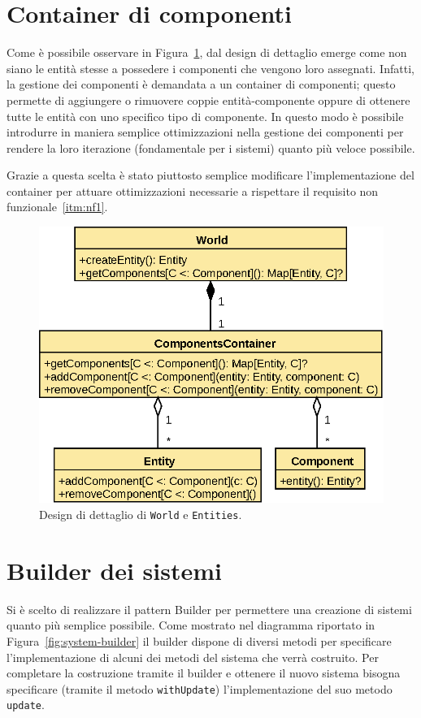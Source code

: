 

\section{Container di componenti}\label{sec:container-di-componenti}
Come è possibile osservare in Figura~\ref{fig:world-detail}, dal design di dettaglio emerge come
non siano le entità stesse a possedere i componenti che vengono loro assegnati.
Infatti, la gestione dei componenti è demandata a un container di componenti;
questo permette di aggiungere o rimuovere coppie entità-componente oppure di ottenere tutte le entità con uno specifico
tipo di componente.
In questo modo è possibile introdurre in maniera semplice ottimizzazioni nella gestione dei
componenti per rendere la loro iterazione (fondamentale per i sistemi) quanto più veloce possibile.

Grazie a questa scelta è stato piuttosto semplice modificare l'implementazione del container per attuare ottimizzazioni
necessarie a rispettare il requisito non funzionale~\ref{itm:nf1}.
\begin{figure}[H]
    \centering
    \includegraphics[width=\textwidth]{./img/WorldDetail}
    \caption{Design di dettaglio di \texttt{World} e \texttt{Entities}.}
    \label{fig:world-detail}
\end{figure}

\section{Builder dei sistemi}\label{sec:builder-dei-sistemi}
Si è scelto di realizzare il pattern Builder per permettere una creazione di sistemi quanto più semplice possibile.
Come mostrato nel diagramma riportato in Figura~\ref{fig:system-builder} il builder dispone di diversi
metodi per specificare l'implementazione di alcuni dei metodi del sistema che verrà costruito.
Per completare la costruzione tramite il builder e ottenere il nuovo sistema bisogna specificare
(tramite il metodo \texttt{withUpdate}) l'implementazione del suo metodo \texttt{update}.

